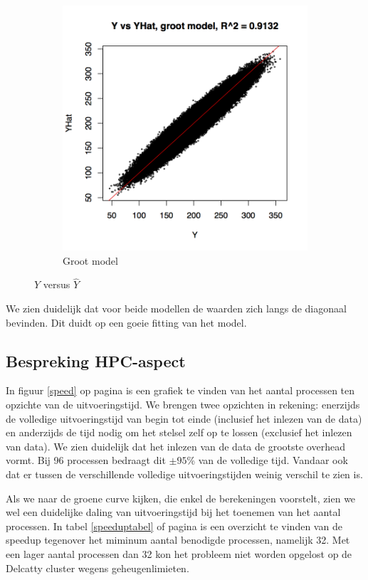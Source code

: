 \documentclass[a4paper,12pt]{report}
\begin{document}
\begin{figure}
\begin{subfigure}[b]{0.45\textwidth}
                \includegraphics[width=\textwidth]{includes/Y-YHat-big.png}
                \caption{Groot model}
        \end{subfigure}
        \caption{$Y$ versus $\hat{Y}$}
        \label{YvsYHatGraphs}
\end{figure}

We zien duidelijk dat voor beide modellen de waarden zich langs de diagonaal bevinden. Dit duidt op een goeie fitting van het model.

\subsection{Bespreking HPC-aspect}
In figuur \ref{speed} op pagina \pageref{speed} is een grafiek te vinden van het aantal processen ten opzichte van de uitvoeringstijd. We brengen twee opzichten in rekening: enerzijds de volledige uitvoeringstijd van begin tot einde (inclusief het inlezen van de data) en anderzijds de tijd nodig om het stelsel zelf op te lossen (exclusief het inlezen van data). We zien duidelijk dat het inlezen van de data de grootste overhead vormt. Bij 96 processen bedraagt dit $\pm95$\% van de volledige tijd. Vandaar ook dat er tussen de verschillende volledige uitvoeringstijden weinig verschil te zien is. 

Als we naar de groene curve kijken, die enkel de berekeningen voorstelt, zien we wel een duidelijke daling van uitvoeringstijd bij het toenemen van het aantal processen. In tabel \ref{speeduptabel} of pagina \pageref{speed} is een overzicht te vinden van de speedup tegenover het miminum aantal benodigde processen, namelijk 32. Met een lager aantal processen dan 32 kon het probleem niet worden opgelost op de Delcatty cluster wegens geheugenlimieten.
\end{document}
